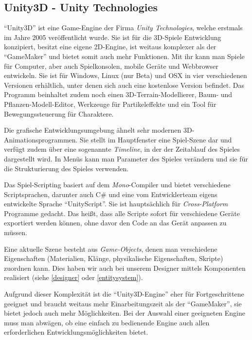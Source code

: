 \subsection{Unity3D - Unity Technologies}

"`Unity3D"' ist eine Game-Engine der Firma \textit{Unity Technologies}, welche erstmals im Jahre 2005 veröffentlicht wurde. Sie ist für die 3D-Spiele Entwicklung konzipiert, besitzt eine eigene 2D-Engine, ist weitaus komplexer als der "`GameMaker"' und bietet somit auch mehr Funktionen. 
Mit ihr kann man Spiele für Computer, aber auch Spielkonsolen, mobile Geräte und Webbrowser entwickeln. Sie ist für Windows, Linux (nur Beta) und OSX in vier verschiedenen Versionen erhältlich, unter denen sich auch eine kostenlose Version befindet. Das Programm beinhaltet zudem noch einen 3D-Terrain-Modellierer, Baum- und Pflanzen-Modell-Editor, Werkzeuge für Partikeleffekte und ein Tool für Bewegungssteuerung für Charaktere.

Die grafische Entwicklungsumgebung ähnelt sehr modernen 3D-Animationsprogrammen. Sie stellt im Hauptfenster eine Spiel-Szene dar und verfügt zudem über eine sogenannte \textit{Timeline}, in der der Zeitablauf des Spieles dargestellt wird. In Menüs kann man Parameter des Spieles verändern und sie für die Strukturierung des Spieles verwenden. 

Das Spiel-Scripting basiert auf dem \textit{Mono}-Compiler und bietet verschiedene Scriptsprachen, darunter auch C\# und eine vom Entwicklerteam eigens entwickelte Sprache "`UnityScript"'. Sie ist hauptsächlich für \textit{Cross-Platform} Programme gedacht. Das heißt, dass alle Scripte sofort für verschiedene Geräte exportiert werden können, ohne davor den Code an das Gerät anpassen zu müssen.

Eine aktuelle Szene besteht aus \textit{Game-Objects}, denen man verschiedene Eigenschaften (Materialien, Klänge, physikalische Eigenschaften, Skripte) zuordnen kann. Dies haben wir auch bei unserem Designer mittels Komponenten realisiert (siehe \cref{designer} oder \cref{entitysystem}).

Aufgrund dieser Komplexität ist die "`Unity3D-Engine"' eher für Fortgeschrittene geeignet und braucht weitaus mehr Einarbeitungszeit als der "`GameMaker"', sie bietet jedoch auch mehr Möglichkeiten.
Bei der Auswahl einer geeigneten Engine muss man abwägen, ob eine einfach zu bedienende Engine auch allen erforderlichen Entwicklungsmöglichkeiten bietet.
